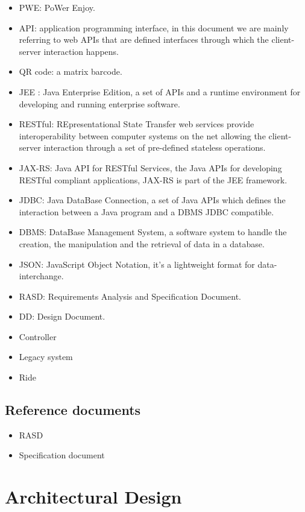\documentclass[]{article}
\providecommand{\tightlist}{%
  \setlength{\itemsep}{0pt}\setlength{\parskip}{0pt}}
\begin{document}
\begin{itemize}
\tightlist
\item
  PWE: PoWer Enjoy.
\item
  API: application programming interface, in this document we are mainly
  referring to web APIs that are defined interfaces through which the
  client-server interaction happens.
\item
  QR code: a matrix barcode.
\item
  JEE : Java Enterprise Edition, a set of APIs and a runtime environment
  for developing and running enterprise software.
\item
  RESTful: REpresentational State Transfer web services provide
  interoperability between computer systems on the net allowing the
  client-server interaction through a set of pre-defined stateless
  operations.
\item
  JAX-RS: Java API for RESTful Services, the Java APIs for developing
  RESTful compliant applications, JAX-RS is part of the JEE framework.
\item
  JDBC: Java DataBase Connection, a set of Java APIs which defines the
  interaction between a Java program and a DBMS JDBC compatible.
\item
  DBMS: DataBase Management System, a software system to handle the
  creation, the manipulation and the retrieval of data in a database.
\item
  JSON: JavaScript Object Notation, it's a lightweight format for
  data-interchange.
\item
  RASD: Requirements Analysis and Specification Document.
\item
  DD: Design Document.
\item
  Controller
\item
  Legacy system
\item
  Ride
\end{itemize}

\subsection{Reference documents}\label{reference-documents}

\begin{itemize}
\tightlist
\item
  RASD
\item
  Specification document \newpage
\end{itemize}

\section{Architectural Design}\label{architectural-design}
\end{document}
